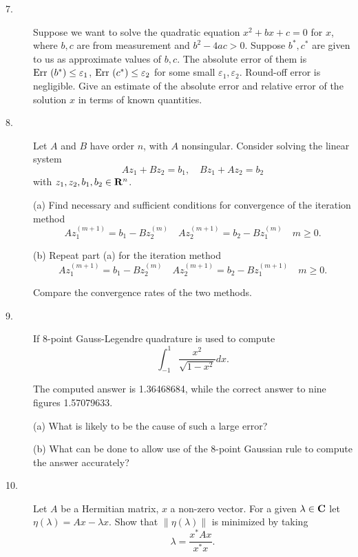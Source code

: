 \documentclass{article}
\begin{document}
\begin{description}
\item[7.]
Suppose we want to solve the quadratic equation $x^2 + bx + c = 0$ for $x$,
where $b,c$ are from measurement and $b^2 - 4ac >0$. Suppose
$b^\ast, c^\ast$ are given to us as approximate values of $b,c$. The
absolute error of them is $\hbox{Err\ } (b^\ast) \leq \varepsilon_1$,
$\hbox{Err\ } (c^\ast) \leq \varepsilon_2$ for some small
$\varepsilon_1, \varepsilon_2$. Round-off error is negligible. Give an
estimate of the absolute error and relative error of the solution $x$
in terms of known quantities.

\item[8.]
Let $A$ and $B$ have order $n$, with $A$ nonsingular. Consider solving the
linear system
$$Az_1 + Bz_2 = b_1, \quad Bz_1 + Az_2 = b_2$$
with $z_1, z_2, b_1, b_2 \in {\bf R}^n$.

\item[\quad] (a)
Find necessary and sufficient conditions for convergence of the iteration
method
$$Az_1^{(m+1)} = b_1 - Bz_2^{(m)} \quad Az_2^{(m+1)} = b_2 - Bz_1^{(m)}
  \quad m \geq 0.$$

\item[\quad] (b)
Repeat part (a) for the iteration method
$$Az_1^{(m+1)} = b_1 - Bz_2^{(m)} \quad Az_2^{(m+1)} = b_2 - Bz_1^{(m+1)}
  \quad m \geq 0.$$

Compare the convergence rates of the two methods.

\item[9.]
If 8-point Gauss-Legendre quadrature is used to compute
$$\int^1_{-1} \frac{x^2}{\sqrt{1-x^2}} dx.$$

The computed answer is 1.36468684, while the correct answer to nine figures
1.57079633.

\item[\quad] (a)
What is likely to be the cause of such a large error?

\item[\quad] (b)
What can be done to allow use of the 8-point Gaussian rule to compute
the answer accurately?

\item[10.]
Let $A$ be a Hermitian matrix, $x$ a non-zero vector. For a given
$\lambda \in {\bf C}$ let $\eta (\lambda) = Ax- \lambda x$.
Show that $\parallel \eta (\lambda) \parallel$ is minimized by taking
$$\lambda = \frac{x^\ast Ax}{x^\ast x}.$$







\end{description}    
\end{document}

